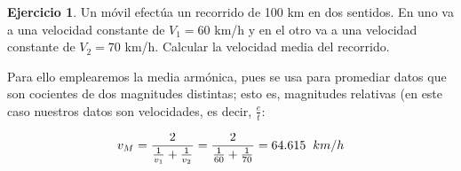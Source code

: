 \documentclass[a4paper, 12pt]{article}
\theoremstyle{definition}
\newtheorem{ej}{Ejercicio}
\begin{document}
\begin{ej}
Un móvil efectúa un recorrido de 100 km en dos sentidos. En uno va a una velocidad constante de \(V_1 = 60\) km/h y en el otro va a una velocidad constante de \(V_2 = 70\) km/h. Calcular la velocidad media del recorrido. 
\newline

\begin{center}
    \end{center}

Para ello emplearemos la media armónica, pues se usa para promediar datos que son cocientes de dos magnitudes distintas; esto es, magnitudes relativas (en este caso nuestros datos son velocidades, es decir, \(\frac{e}{t}\):

\[
v_M = \frac{2}{\frac{1}{v_1} + \frac{1}{v_2}} = \frac{2}{\frac{1}{60} + \frac{1}{70}} = 64.615 \hspace{0.2cm} km/h
\]
\end{ej}

\newpage
\end{document}
